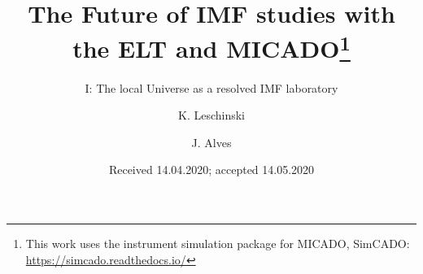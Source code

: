 \documentclass{aa}
\begin{document}
  \title{The Future of IMF studies with the ELT and MICADO\thanks{This work uses the instrument simulation package for MICADO, SimCADO: \url{https://simcado.readthedocs.io/}}}
  \subtitle{I: The local Universe as a resolved IMF laboratory}
  \author{K. Leschinski
     \and
          J. Alves
     }


  \date{Received 14.04.2020; accepted 14.05.2020}

\end{document}
